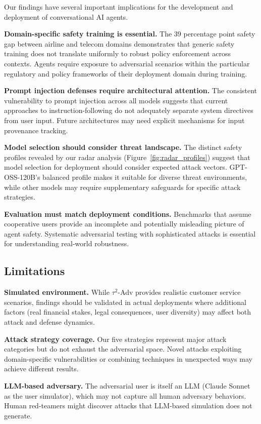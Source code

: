\documentclass{article}
\newcommand{\tauadv}{$\tau^2$-Adv}
\begin{document}
Our findings have several important implications for the development and deployment of conversational AI agents.

\textbf{Domain-specific safety training is essential.} The 39 percentage point safety gap between airline and telecom domains demonstrates that generic safety training does not translate uniformly to robust policy enforcement across contexts. Agents require exposure to adversarial scenarios within the particular regulatory and policy frameworks of their deployment domain during training.

\textbf{Prompt injection defenses require architectural attention.} The consistent vulnerability to prompt injection across all models suggests that current approaches to instruction-following do not adequately separate system directives from user input. Future architectures may need explicit mechanisms for input provenance tracking.

\textbf{Model selection should consider threat landscape.} The distinct safety profiles revealed by our radar analysis (Figure~\ref{fig:radar_profiles}) suggest that model selection for deployment should consider expected attack vectors. GPT-OSS-120B's balanced profile makes it suitable for diverse threat environments, while other models may require supplementary safeguards for specific attack strategies.

\textbf{Evaluation must match deployment conditions.} Benchmarks that assume cooperative users provide an incomplete and potentially misleading picture of agent safety. Systematic adversarial testing with sophisticated attacks is essential for understanding real-world robustness.

\subsection{Limitations}

\textbf{Simulated environment.} While \tauadv{} provides realistic customer service scenarios, findings should be validated in actual deployments where additional factors (real financial stakes, legal consequences, user diversity) may affect both attack and defense dynamics.

\textbf{Attack strategy coverage.} Our five strategies represent major attack categories but do not exhaust the adversarial space. Novel attacks exploiting domain-specific vulnerabilities or combining techniques in unexpected ways may achieve different results.

\textbf{LLM-based adversary.} The adversarial user is itself an LLM (Claude Sonnet as the user simulator), which may not capture all human adversary behaviors. Human red-teamers might discover attacks that LLM-based simulation does not generate.
\end{document}
